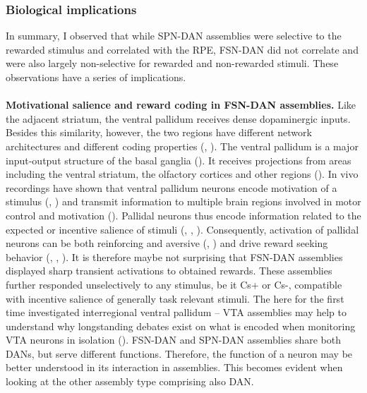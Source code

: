 \subsubsection{Biological implications}
In summary, I observed that while SPN-DAN assemblies were selective to the rewarded stimulus and correlated with the RPE, FSN-DAN did not correlate and were also largely non-selective for rewarded and non-rewarded stimuli. These observations have a series of implications.\\\\
\textbf{Motivational salience and reward coding in FSN-DAN assemblies.} Like the adjacent striatum, the ventral pallidum receives dense dopaminergic inputs. Besides this similarity, however, the two regions have different network architectures and different coding properties (\cite{Heimer1997}, \cite{Tachibana2012}). The ventral pallidum is a major input-output structure of the basal ganglia (\cite{Heimer1997}). It receives projections from areas including the ventral striatum, the olfactory cortices and other regions (\cite{Haber}). In vivo recordings have shown that ventral pallidum neurons encode motivation of a stimulus (\cite{Tachibana2012}, \cite{TianHuang}) and transmit information to multiple brain regions involved in motor control and motivation (\cite{Haber}). Pallidal neurons thus encode information related to the expected or incentive salience of stimuli (\cite{Richard}, \cite{TianHuang}, \cite{Tindell}). Consequently, activation of pallidal neurons can be both reinforcing and aversive (\cite{Knowland}, \cite{Faget}) and drive reward seeking behavior (\cite{Humphries}, \cite{Root}, \cite{Berridge}). It is therefore maybe not surprising that FSN-DAN assemblies displayed sharp transient activations to obtained rewards. These assemblies further responded unselectively to any stimulus, be it Cs+ or Cs-, compatible with incentive salience of generally task relevant stimuli. The here for the first time investigated interregional ventral pallidum – VTA assemblies may help to understand why longstanding debates exist on what is encoded when monitoring VTA neurons in isolation (\cite{Redgrave}). FSN-DAN and SPN-DAN assemblies share both DANs, but serve different functions. Therefore, the function of a neuron may be better understood in its interaction in assemblies. This becomes evident when looking at the other assembly type comprising also DAN.\\\\
